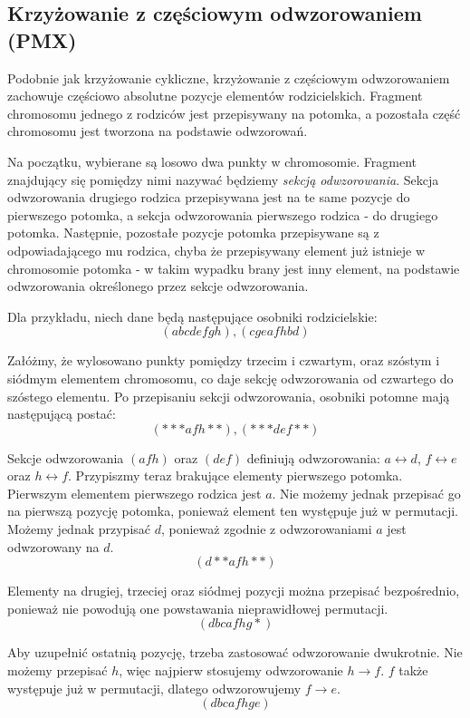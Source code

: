 \documentclass{xmgr}
\begin{document}
\subsection{Krzyżowanie z częściowym odwzorowaniem (PMX)}

Podobnie jak krzyżowanie cykliczne, krzyżowanie z częściowym odwzorowaniem~\cite{GoldbergLingle} zachowuje częściowo absolutne pozycje elementów rodzicielskich. Fragment chromosomu jednego z rodziców jest przepisywany na potomka, a pozostała część chromosomu jest tworzona na podstawie odwzorowań.

Na początku, wybierane są losowo dwa punkty w chromosomie. Fragment znajdujący się pomiędzy nimi nazywać będziemy \emph{sekcją odwzorowania}. Sekcja odwzorowania drugiego rodzica przepisywana jest na te same pozycje do pierwszego potomka, a sekcja odwzorowania pierwszego rodzica - do drugiego potomka. Następnie, pozostałe pozycje potomka przepisywane są z odpowiadającego mu rodzica, chyba że przepisywany element już istnieje w chromosomie potomka - w takim wypadku brany jest inny element, na podstawie odwzorowania określonego przez sekcje odwzorowania.

Dla przykładu, niech dane będą następujące osobniki rodzicielskie:
$$ (a b c d e f g h), (c g e a f h b d) $$

Załóżmy, że wylosowano punkty pomiędzy trzecim i czwartym, oraz szóstym i siódmym elementem chromosomu, co daje sekcję odwzorowania od czwartego do szóstego elementu. Po przepisaniu sekcji odwzorowania, osobniki potomne mają następującą postać:
$$ (* * * a f h * *), (* * * d e f * *) $$

Sekcje odwzorowania $ (a f h) $ oraz $ (d e f) $ definiują odwzorowania: $ a \leftrightarrow d $, $ f \leftrightarrow e $ oraz $ h \leftrightarrow f $. Przypiszmy teraz brakujące elementy pierwszego potomka. Pierwszym elementem pierwszego rodzica jest $a$. Nie możemy jednak przepisać go na pierwszą pozycję potomka, ponieważ element ten występuje już w permutacji. Możemy jednak przypisać $d$, ponieważ zgodnie z odwzorowaniami $a$ jest odwzorowany na $d$.
$$ (d * * a f h * *) $$

Elementy na drugiej, trzeciej oraz siódmej pozycji można przepisać bezpośrednio, ponieważ nie powodują one powstawania nieprawidłowej permutacji.
$$ (d b c a f h g *) $$

Aby uzupełnić ostatnią pozycję, trzeba zastosować odwzorowanie dwukrotnie. Nie możemy przepisać $h$, więc najpierw stosujemy odwzorowanie $h \rightarrow f$. $f$ także występuje już w permutacji, dlatego odwzorowujemy $f \rightarrow e$.
$$ (d b c a f h g e) $$
\end{document}
